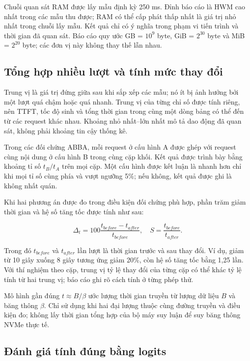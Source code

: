 Chuỗi quan sát RAM được lấy mẫu định kỳ 250 ms. Đỉnh báo cáo là HWM cao nhất trong các mẫu thu được; RAM có thể cấp phát thấp nhất là giá trị nhỏ nhất trong chuỗi lấy mẫu. Kết quả chỉ có ý nghĩa trong phạm vi tiến trình và thời gian đã quan sát. Báo cáo quy ước GB = $10^9$ byte, GiB = $2^{30}$ byte và MiB = $2^{20}$ byte; các đơn vị này không thay thế lẫn nhau.

\subsection{Tổng hợp nhiều lượt và tính mức thay đổi}

Trung vị là giá trị đứng giữa sau khi sắp xếp các mẫu; nó ít bị ảnh hưởng bởi một lượt quá chậm hoặc quá nhanh. Trung vị của từng chỉ số được tính riêng, nên TTFT, tốc độ sinh và tổng thời gian trong cùng một dòng bảng có thể đến từ các request khác nhau. Khoảng nhỏ nhất--lớn nhất mô tả dao động đã quan sát, không phải khoảng tin cậy thống kê.

Trong các đối chứng ABBA, mỗi request ở cấu hình A được ghép với request cùng nội dung ở cấu hình B trong cùng cặp khối. Kết quả được trình bày bằng khoảng tỉ số $t_B/t_A$ trên mọi cặp. Một cấu hình được kết luận là nhanh hơn chỉ khi mọi tỉ số cùng phía và vượt ngưỡng 5\%; nếu không, kết quả được ghi là không nhất quán.

Khi hai phương án được đo trong điều kiện đối chứng phù hợp, phần trăm giảm thời gian và hệ số tăng tốc được tính như sau:

\begin{equation}
\label{eq:2.13}
\Delta_t=100\frac{t_{before}-t_{after}}{t_{before}},\quad S=\frac{t_{before}}{t_{after}}.
\end{equation}

Trong đó $t_{before}$ và $t_{after}$ lần lượt là thời gian trước và sau thay đổi. Ví dụ, giảm từ 10 giây xuống 8 giây tương ứng giảm 20\%, còn hệ số tăng tốc bằng 1,25 lần. Với thí nghiệm theo cặp, trung vị tỷ lệ thay đổi của từng cặp có thể khác tỷ lệ tính từ hai trung vị; báo cáo ghi rõ cách tính ở từng phép thử.

Mô hình gần đúng $t\approx B/\beta$ ước lượng thời gian truyền từ lượng dữ liệu $B$ và băng thông $\beta$. Chỉ sử dụng khi hai đại lượng thuộc cùng đường truyền và điều kiện đo; không lấy thời gian tổng hợp của bộ máy suy luận để suy băng thông NVMe thực tế.

\subsection{Đánh giá tính đúng bằng logits}

